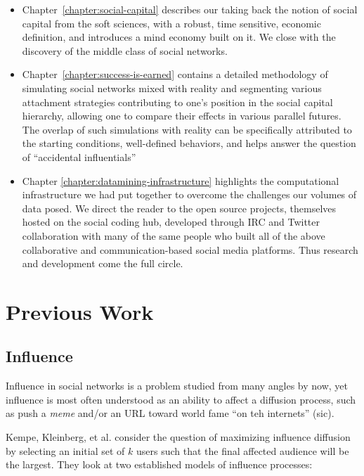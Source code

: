 \documentclass[10pt,oneside]{memoir}
\begin{document}
\begin{Spacing}{2}
\begin{itemize}
\item Chapter~\ref{chapter:social-capital} describes our taking back the notion of social capital from the soft sciences, with a robust, time sensitive, economic definition, and introduces a mind economy built on it.  We close with the discovery of the middle class of social networks.

\item Chapter~\ref{chapter:success-is-earned} contains a detailed methodology of simulating social networks mixed with reality and segmenting various attachment strategies contributing to one's position in the social capital hierarchy, allowing one to compare their effects in various parallel futures.  The overlap of such simulations with reality can be specifically attributed to the starting conditions, well-defined behaviors, and helps answer the question of ``accidental influentials''

\item Chapter \ref{chapter:datamining-infrastructure} highlights the computational infrastructure we had put together to overcome the challenges our volumes of data posed.  We direct the reader to the open source projects, themselves hosted on the social coding hub, developed through IRC and Twitter collaboration with many of the same people who built all of the above collaborative and communication-based social media platforms.  Thus research and development come the full circle.
\end{itemize}

\pagebreak \chapter{Previous Work}
\label{previouswork}

\section{Influence}
\label{influence}

Influence in social networks is a problem studied from many angles by now, yet influence is most often understood as an ability to affect a diffusion process, such as  push a {\itshape meme} and/or an URL toward world fame ``on teh internets'' (sic).


Kempe, Kleinberg, et al. \cite{Kempe:2005:Nodes} consider the question of maximizing influence diffusion by selecting an initial set of $k$ users such that the final affected audience will be the largest.  They look at two established models of influence processes:



\end{Spacing}
\end{document}
